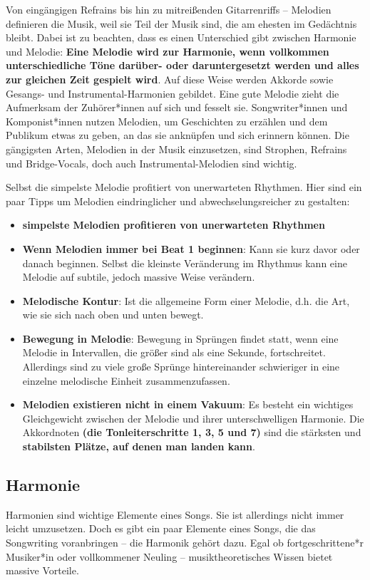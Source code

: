 Von eingängigen Refrains bis hin zu mitreißenden Gitarrenriffs – Melodien definieren die Musik, 
weil sie Teil der Musik sind, die am ehesten im Gedächtnis bleibt. Dabei ist zu beachten, dass 
es einen Unterschied gibt zwischen Harmonie 
und Melodie: \textbf{Eine Melodie wird zur Harmonie, wenn vollkommen unterschiedliche Töne darüber- oder 
daruntergesetzt werden und alles zur gleichen Zeit gespielt wird}. Auf diese Weise werden Akkorde 
sowie Gesangs- und Instrumental-Harmonien gebildet. Eine gute Melodie zieht die Aufmerksam der 
Zuhörer*innen auf sich und fesselt sie. Songwriter*innen und Komponist*innen nutzen Melodien, 
um Geschichten zu erzählen und dem Publikum etwas zu geben, an das sie anknüpfen und sich erinnern 
können. Die gängigsten Arten, Melodien in der Musik einzusetzen, sind Strophen, Refrains und Bridge-Vocals, 
doch auch Instrumental-Melodien sind wichtig.

Selbst die simpelste Melodie profitiert von unerwarteten Rhythmen. Hier sind ein paar Tipps um Melodien 
eindringlicher und abwechselungsreicher zu gestalten:
\begin{itemize}
    \item \textbf{simpelste Melodien profitieren von unerwarteten Rhythmen}
    \item \textbf{Wenn Melodien immer bei Beat 1 beginnen}: Kann sie kurz davor oder danach beginnen. Selbst die 
    kleinste Veränderung im Rhythmus kann eine Melodie auf subtile, jedoch massive Weise verändern.
    \item \textbf{Melodische Kontur}: Ist die allgemeine Form einer Melodie, d.h. die Art, wie sie sich nach 
    oben und unten bewegt.
    \item \textbf{Bewegung in Melodie}: Bewegung in Sprüngen findet statt, wenn eine Melodie in Intervallen, die 
    größer sind als eine Sekunde, fortschreitet. Allerdings sind zu viele große Sprünge hintereinander schwieriger 
    in eine einzelne melodische Einheit zusammenzufassen.
    \item \textbf{Melodien existieren nicht in einem Vakuum}: Es besteht ein wichtiges Gleichgewicht zwischen der 
    Melodie und ihrer unterschwelligen Harmonie. Die Akkordnoten \textbf{(die Tonleiterschritte 1, 3, 5 und 7)} sind die 
    stärksten und \textbf{stabilsten Plätze, auf denen man landen kann}.
    
\end{itemize}


\subsection{Harmonie}
Harmonien sind wichtige Elemente eines Songs. Sie ist allerdings nicht immer leicht umzusetzen. 
Doch es gibt ein paar Elemente eines Songs, die das Songwriting voranbringen – die Harmonik gehört dazu. 
Egal ob fortgeschrittene*r Musiker*in oder vollkommener Neuling – musiktheoretisches Wissen bietet massive Vorteile.

